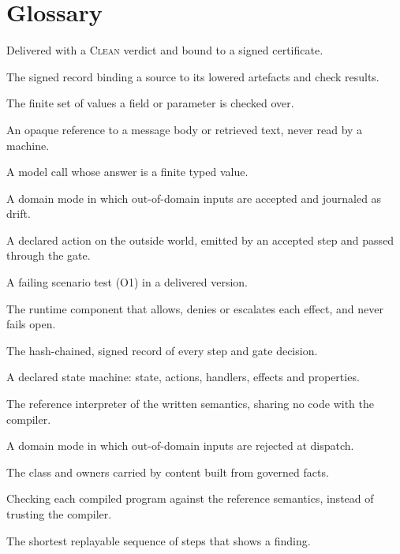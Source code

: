 \documentclass[11pt]{article}
\begin{document}



\appendix
\section{Glossary}
\begin{description}[style=nextline,leftmargin=1.2em]
\item[Admitted] Delivered with a \textsc{Clean} verdict and bound to a signed certificate.
\item[Certificate] The signed record binding a source to its lowered artefacts and check results.
\item[Check domain] The finite set of values a field or parameter is checked over.
\item[Content] An opaque reference to a message body or retrieved text, never read by a machine.
\item[Decision] A model call whose answer is a finite typed value.
\item[Disclosed] A domain mode in which out-of-domain inputs are accepted and journaled as drift.
\item[Effect] A declared action on the outside world, emitted by an accepted step and passed through the gate.
\item[Escaped defect] A failing scenario test (O1) in a delivered version.
\item[Gate] The runtime component that allows, denies or escalates each effect, and never fails open.
\item[Journal] The hash-chained, signed record of every step and gate decision.
\item[Machine] A declared state machine: state, actions, handlers, effects and properties.
\item[poly-ref] The reference interpreter of the written semantics, sharing no code with the compiler.
\item[Strict] A domain mode in which out-of-domain inputs are rejected at dispatch.
\item[Taint] The class and owners carried by content built from governed facts.
\item[Translation validation] Checking each compiled program against the reference semantics, instead of trusting the compiler.
\item[Witness] The shortest replayable sequence of steps that shows a finding.
\end{description}
\end{document}
